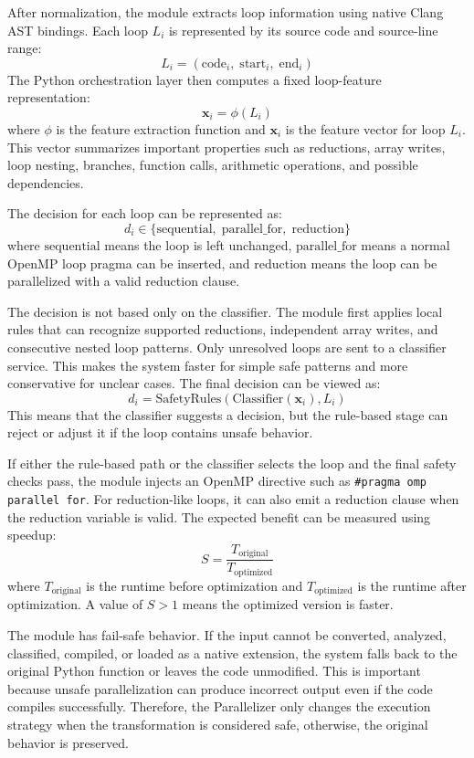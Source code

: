\documentclass[12pt,a4paper,oneside]{report}
\begin{document}
After normalization, the module extracts loop information using native Clang AST
bindings. Each loop \(L_i\) is represented by its source code and source-line
range:
\[
L_i = (\text{code}_i,\; \text{start}_i,\; \text{end}_i)
\]
The Python orchestration layer then computes a fixed loop-feature representation:
\[
\mathbf{x}_i = \phi(L_i)
\]
where \(\phi\) is the feature extraction function and \(\mathbf{x}_i\) is the
feature vector for loop \(L_i\). This vector summarizes important properties
such as reductions, array writes, loop nesting, branches, function calls,
arithmetic operations, and possible dependencies.

The decision for each loop can be represented as:
\[
d_i \in \{\text{sequential},\; \text{parallel\_for},\; \text{reduction}\}
\]
where \(\text{sequential}\) means the loop is left unchanged,
\(\text{parallel\_for}\) means a normal OpenMP loop pragma can be inserted, and
\(\text{reduction}\) means the loop can be parallelized with a valid reduction
clause.

The decision is not based only on the classifier. The module first applies local
rules that can recognize supported reductions, independent array writes, and
consecutive nested loop patterns. Only unresolved loops are sent to a classifier
service. This makes the system faster for simple safe patterns and more
conservative for unclear cases. The final decision can be viewed as:
\[
d_i = \text{SafetyRules}(\text{Classifier}(\mathbf{x}_i), L_i)
\]
This means that the classifier suggests a decision, but the rule-based stage can
reject or adjust it if the loop contains unsafe behavior.

If either the rule-based path or the classifier selects the loop and the final
safety checks pass, the module injects an OpenMP directive such as
\texttt{\#pragma omp parallel for}. For reduction-like loops, it can also emit a
reduction clause when the reduction variable is valid. The expected benefit can
be measured using speedup:
\[
S = \frac{T_{\text{original}}}{T_{\text{optimized}}}
\]
where \(T_{\text{original}}\) is the runtime before optimization and
\(T_{\text{optimized}}\) is the runtime after optimization. A value of
\(S > 1\) means the optimized version is faster.

The module has fail-safe behavior. If the input cannot be converted, analyzed,
classified, compiled, or loaded as a native extension, the system falls back to
the original Python function or leaves the code unmodified. This is important
because unsafe parallelization can produce incorrect output even if the code
compiles successfully. Therefore, the Parallelizer only changes the execution
strategy when the transformation is considered safe, otherwise, the original
behavior is preserved.
\end{document}
